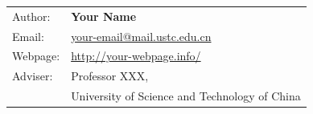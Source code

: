 \begin{titlepage}
\vspace{0.3cm}
\begin{table}[h!]
    \begin{tabular}{p{}p{}}
        Author: & \textbf{Your Name} \\
        Email: & \href{mailto:your-email@rice.edu}{your-email@mail.ustc.edu.cn} \\
        Webpage: & \href{http://your-webpage.info/}{http://your-webpage.info/} \\
        Adviser: & Professor XXX, \\
                & University of Science and Technology of China
    \end{tabular}
\end{table}


\end{titlepage}